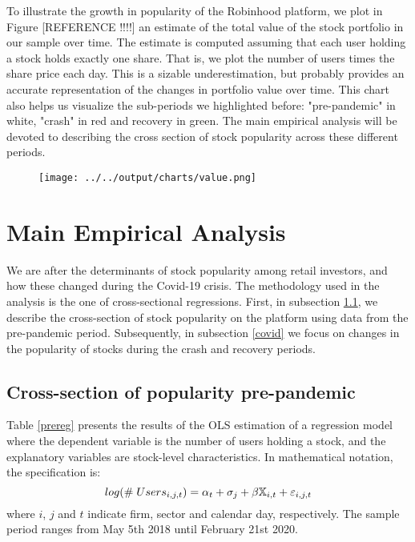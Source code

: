 \documentclass[12pt]{article}
\numberwithin{equation}{section} %
\begin{document}
To illustrate the growth in popularity of the Robinhood platform, we plot in Figure [REFERENCE !!!!] an estimate of the total value of the stock portfolio in our sample over time. The estimate is computed assuming that each user holding a stock holds exactly one share. That is, we plot the number of users times the share price each day. This is a sizable underestimation, but probably provides an accurate representation of the changes in portfolio value over time. This chart also helps us visualize the sub-periods we highlighted before: "pre-pandemic" in white, "crash" in red and recovery in green. The main empirical analysis will be devoted to describing the cross section of stock popularity across these different periods.

\begin{figure}[h!]
\centering
\texttt{[image: ../../output/charts/value.png]}
\end{figure}


\section{Main Empirical Analysis}

We are after the determinants of stock popularity among retail investors, and how these changed during the Covid-19 crisis. The methodology used in the analysis is the one of cross-sectional regressions. First, in subsection \ref{pre}, we describe the cross-section of stock popularity on the platform using data from the pre-pandemic period. Subsequently, in subsection \ref{covid} we focus on changes in the popularity of stocks during the crash and recovery periods.

\subsection{Cross-section of popularity pre-pandemic} \label{pre}

Table \ref{prereg} presents the results of the OLS estimation of a regression model where the dependent variable is the number of users holding a stock, and the explanatory variables are stock-level characteristics. In mathematical notation, the specification is:
$$
log(\# \hspace{1mm} Users_{i,j,t}) = \alpha_t + \sigma_j + \beta \mathbb{X}_{i,t} + \varepsilon_{i,j,t}
$$
where $i$, $j$ and $t$ indicate firm, sector and calendar day, respectively. The sample period ranges from May 5th 2018 until February 21st 2020.
\end{document}
